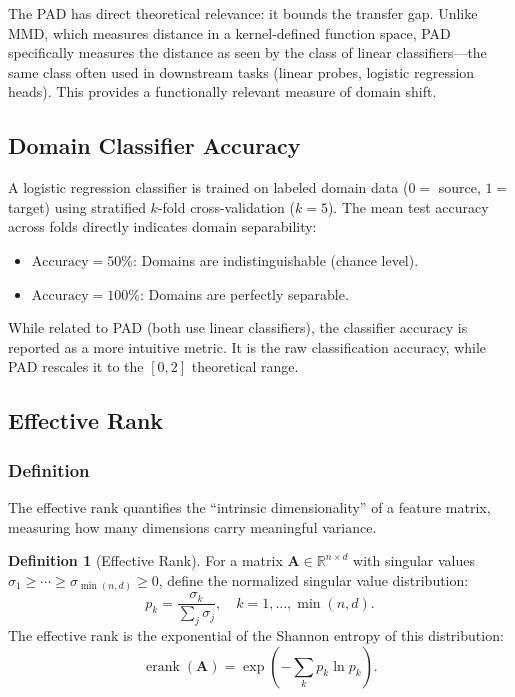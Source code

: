 \documentclass[11pt,a4paper]{article}
\DeclareMathOperator{\erank}{erank}
\newcommand{\R}{\mathbb{R}}
\theoremstyle{definition}
\newtheorem{definition}{Definition}
\begin{document}
The PAD has direct theoretical relevance: it bounds the transfer gap. Unlike MMD, which measures distance in a kernel-defined function space, PAD specifically measures the distance as seen by the class of linear classifiers---the same class often used in downstream tasks (linear probes, logistic regression heads). This provides a functionally relevant measure of domain shift.


\subsection{Domain Classifier Accuracy}\label{sec:clf}

A logistic regression classifier is trained on labeled domain data ($0 =$ source, $1 =$ target) using stratified $k$-fold cross-validation ($k = 5$). The mean test accuracy across folds directly indicates domain separability:

\begin{itemize}[nosep]
  \item $\text{Accuracy} = 50\%$: Domains are indistinguishable (chance level).
  \item $\text{Accuracy} = 100\%$: Domains are perfectly separable.
\end{itemize}

While related to PAD (both use linear classifiers), the classifier accuracy is reported as a more intuitive metric. It is the raw classification accuracy, while PAD rescales it to the $[0, 2]$ theoretical range.


\subsection{Effective Rank}\label{sec:erank}

\subsubsection{Definition}

The effective rank \cite{roy2007effective} quantifies the ``intrinsic dimensionality'' of a feature matrix, measuring how many dimensions carry meaningful variance.

\begin{definition}[Effective Rank]
For a matrix $\bm{A} \in \R^{n \times d}$ with singular values $\sigma_1 \geq \cdots \geq \sigma_{\min(n,d)} \geq 0$, define the normalized singular value distribution:
\begin{equation}\label{eq:sv-dist}
  p_k = \frac{\sigma_k}{\sum_{j} \sigma_j}, \quad k = 1, \ldots, \min(n, d).
\end{equation}
The effective rank is the exponential of the Shannon entropy of this distribution:
\begin{equation}\label{eq:erank}
  \erank(\bm{A}) = \exp\!\left( -\sum_{k} p_k \ln p_k \right).
\end{equation}
\end{definition}
\end{document}
